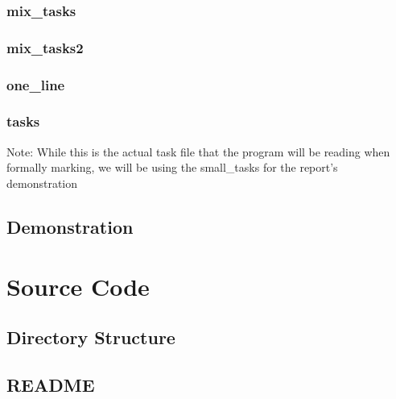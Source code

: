 \documentclass[a4paper, 12pt, titlepage]{article}
\begin{document}
\subsubsection{mix\_tasks}


\subsubsection{mix\_tasks2}


\subsubsection{one\_line}


\subsubsection{tasks}
\begin{multicols}{4}

\end{multicols}

Note: While this is the actual task file that the program will be reading when
formally marking, we will be using the small\_tasks for the report's
demonstration
\newpage

\subsection{Demonstration}

\newpage

\section{Source Code}

\subsection{Directory Structure}

\newpage

\subsection{README}

\newpage
\end{document}
